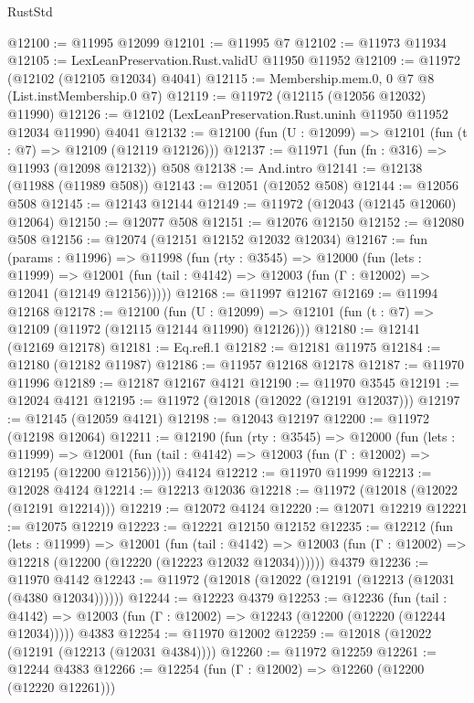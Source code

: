 \begin{lexlean}{RustStd}
\begin{coremodule}
@12100 := @11995 @12099
@12101 := @11995 @7
@12102 := @11973 @11934
@12105 := LexLeanPreservation.Rust.validU @11950 @11952
@12109 := @11972 (@12102 (@12105 @12034) @4041)
@12115 := Membership.mem.{0, 0} @7 @8 (List.instMembership.{0} @7)
@12119 := @11972 (@12115 (@12056 @12032) @11990)
@12126 := @12102 (LexLeanPreservation.Rust.uninh @11950 @11952 @12034 @11990) @4041
@12132 := @12100 (fun (U : @12099) => @12101 (fun (t : @7) => @12109 (@12119 @12126)))
@12137 := @11971 (fun (fn : @316) => @11993 (@12098 @12132)) @508
@12138 := And.intro
@12141 := @12138 (@11988 (@11989 @508))
@12143 := @12051 (@12052 @508)
@12144 := @12056 @508
@12145 := @12143 @12144
@12149 := @11972 (@12043 (@12145 @12060) @12064)
@12150 := @12077 @508
@12151 := @12076 @12150
@12152 := @12080 @508
@12156 := @12074 (@12151 @12152 @12032 @12034)
@12167 := fun (params : @11996) =>
  @11998
    (fun (rty : @3545) =>
    @12000
      (fun (lets : @11999) =>
      @12001 (fun (tail : @4142) => @12003 (fun (Γ : @12002) => @12041 (@12149 @12156)))))
@12168 := @11997 @12167
@12169 := @11994 @12168
@12178 := @12100
    (fun (U : @12099) => @12101 (fun (t : @7) => @12109 (@11972 (@12115 @12144 @11990) @12126)))
@12180 := @12141 (@12169 @12178)
@12181 := Eq.refl.{1}
@12182 := @12181 @11975
@12184 := @12180 (@12182 @11987)
@12186 := @11957 @12168 @12178
@12187 := @11970 @11996
@12189 := @12187 @12167 @4121
@12190 := @11970 @3545
@12191 := @12024 @4121
@12195 := @11972 (@12018 (@12022 (@12191 @12037)))
@12197 := @12145 (@12059 @4121)
@12198 := @12043 @12197
@12200 := @11972 (@12198 @12064)
@12211 := @12190
    (fun (rty : @3545) =>
    @12000
      (fun (lets : @11999) =>
      @12001 (fun (tail : @4142) => @12003 (fun (Γ : @12002) => @12195 (@12200 @12156)))))
    @4124
@12212 := @11970 @11999
@12213 := @12028 @4124
@12214 := @12213 @12036
@12218 := @11972 (@12018 (@12022 (@12191 @12214)))
@12219 := @12072 @4124
@12220 := @12071 @12219
@12221 := @12075 @12219
@12223 := @12221 @12150 @12152
@12235 := @12212
    (fun (lets : @11999) =>
    @12001
      (fun (tail : @4142) =>
      @12003 (fun (Γ : @12002) => @12218 (@12200 (@12220 (@12223 @12032 @12034))))))
    @4379
@12236 := @11970 @4142
@12243 := @11972 (@12018 (@12022 (@12191 (@12213 (@12031 (@4380 @12034))))))
@12244 := @12223 @4379
@12253 := @12236
    (fun (tail : @4142) => @12003 (fun (Γ : @12002) => @12243 (@12200 (@12220 (@12244 @12034)))))
    @4383
@12254 := @11970 @12002
@12259 := @12018 (@12022 (@12191 (@12213 (@12031 @4384))))
@12260 := @11972 @12259
@12261 := @12244 @4383
@12266 := @12254 (fun (Γ : @12002) => @12260 (@12200 (@12220 @12261)))

\end{coremodule}
\end{lexlean}
